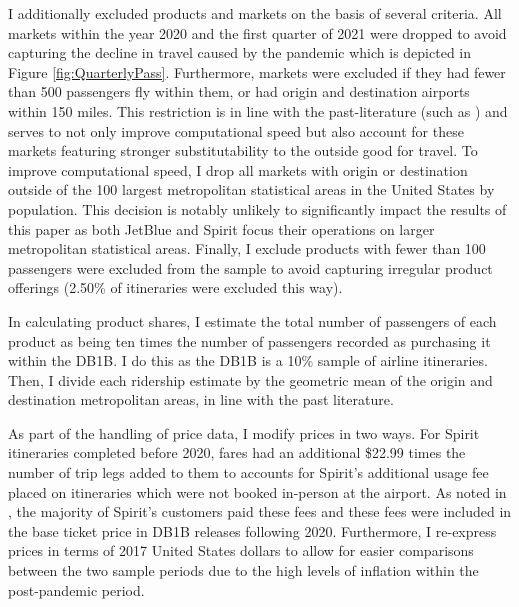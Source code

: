 \documentclass{article}
\begin{document}
\begin{appendices}
	I additionally excluded products and markets on the basis of several criteria. All markets within the year 2020 and the first quarter of 2021 were dropped to avoid capturing the decline in travel caused by the pandemic which is depicted in Figure \ref{fig:QuarterlyPass}. Furthermore, markets were excluded if they had fewer than 500 passengers fly within them, or had origin and destination airports within 150 miles. This restriction is in line with the past-literature (such as \citet{ciliberto_does_2014}) and serves to not only improve computational speed but also account for these markets featuring stronger substitutability to the outside good for travel. To improve computational speed, I drop all markets with origin or destination outside of the 100 largest metropolitan statistical areas in the United States by population. This decision is notably unlikely to significantly impact the results of this paper as both JetBlue and Spirit focus their operations on larger metropolitan statistical areas. Finally, I exclude products with fewer than 100 passengers were excluded from the sample to avoid capturing irregular product offerings (2.50\% of itineraries were excluded this way). 
    	
	In calculating product shares, I estimate the total number of passengers of each product as being ten times the number of passengers recorded as purchasing it within the DB1B. I do this as the DB1B is a 10\% sample of airline itineraries. Then, I divide each ridership estimate by the geometric mean of the origin and destination metropolitan areas, in line with the past literature. 
	
	
	As part of the handling of price data, I modify prices in two ways. For Spirit itineraries completed before 2020, fares had an additional \$22.99 times the number of trip legs added to them to accounts for Spirit's additional usage fee placed on itineraries which were not booked in-person at the airport. As noted in \citet{shrago_spirit_2024}, the majority of Spirit's customers paid these fees and these fees were included in the base ticket price in DB1B releases following 2020. Furthermore, I re-express prices in terms of 2017 United States dollars to allow for easier comparisons between the two sample periods due to the high levels of inflation within the post-pandemic period.


\end{appendices}
\end{document}
